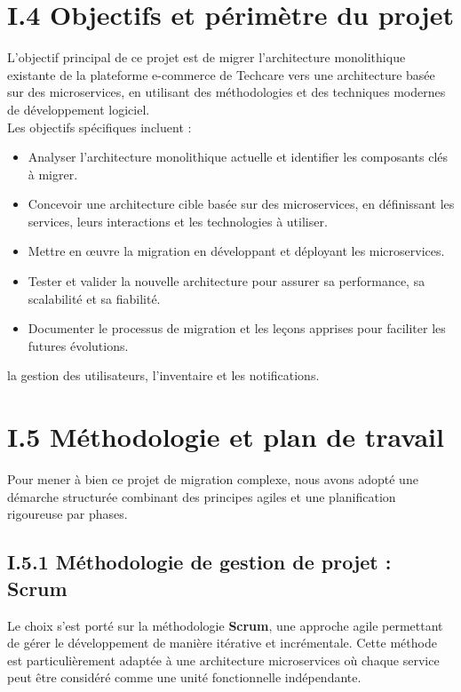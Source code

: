 \section{I.4 Objectifs et périmètre du projet}
L'objectif principal de ce projet est de migrer l'architecture monolithique existante de la plateforme e-commerce de Techcare vers une architecture basée sur des microservices, en utilisant des méthodologies et des techniques modernes de développement logiciel.\\
Les objectifs spécifiques incluent :
\begin{itemize}
    \item Analyser l'architecture monolithique actuelle et identifier les composants clés à migrer.
    \item Concevoir une architecture cible basée sur des microservices, en définissant les services, leurs interactions et les technologies à utiliser.
    \item Mettre en œuvre la migration en développant et déployant les microservices.
    \item Tester et valider la nouvelle architecture pour assurer sa performance, sa scalabilité et sa fiabilité.
    \item Documenter le processus de migration et les leçons apprises pour faciliter les futures évolutions.
\end{itemize}
la gestion des utilisateurs, l'inventaire et les notifications.

\section{I.5 Méthodologie et plan de travail}

Pour mener à bien ce projet de migration complexe, nous avons adopté une démarche structurée combinant des principes agiles et une planification rigoureuse par phases.

\subsection{I.5.1 Méthodologie de gestion de projet : Scrum}

Le choix s'est porté sur la méthodologie \textbf{Scrum}, une approche agile permettant de gérer le développement de manière itérative et incrémentale. Cette méthode est particulièrement adaptée à une architecture microservices où chaque service peut être considéré comme une unité fonctionnelle indépendante.

